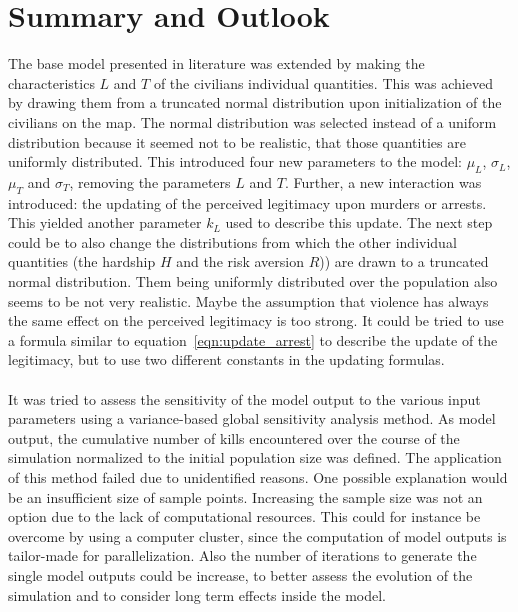 \documentclass[11pt]{article}
\begin{document}
\section{Summary and Outlook}
The base model presented in literature was extended by making the characteristics $L$ and $T$ of the civilians individual quantities. This was achieved by drawing them from a truncated normal distribution upon initialization of the civilians on the map. The normal distribution was selected instead of a uniform distribution because it seemed not to be realistic, that those quantities are uniformly distributed. This introduced four new parameters to the model: $\mu_L$, $\sigma_L$, $\mu_T$ and $\sigma_T$, removing the parameters $L$ and $T$. Further, a new interaction was introduced: the updating of the perceived legitimacy upon murders or arrests. This yielded another parameter $k_L$ used to describe this update. The next step could be to also change the distributions from which the other individual quantities (the hardship $H$ and the risk aversion $R$)) are drawn to a truncated normal distribution. Them being uniformly distributed over the population also seems to be not very realistic. Maybe the assumption that violence has always the same effect on the perceived legitimacy is too strong. It could be tried to use a formula similar to equation~\eqref{eqn:update_arrest} to describe the update of the legitimacy, but to use two different constants in the updating formulas.\\
\\
It was tried to assess the sensitivity of the model output to the various input parameters using a variance-based global sensitivity analysis method. As model output, the cumulative number of kills encountered over the course of the simulation normalized to the initial population size was defined. The application of this method failed due to unidentified reasons. One possible explanation would be an insufficient size of sample points. Increasing the sample size was not an option due to the lack of computational resources. This could for instance be overcome by using a computer cluster, since the computation of model outputs is tailor-made for parallelization. Also the number of iterations to generate the single model outputs could be increase, to better assess the evolution of the simulation and to consider long term effects inside the model.\\
\\
\end{document}
